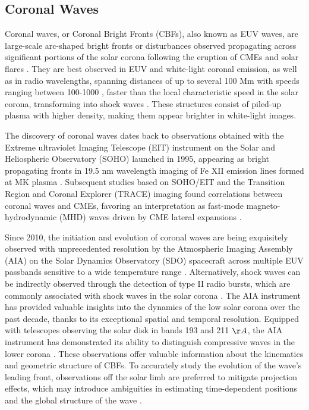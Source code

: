 \subsection{Coronal Waves}
Coronal waves, or Coronal Bright Fronts (CBFs), also known as EUV waves, are large-scale arc-shaped bright fronts or disturbances observed propagating across significant portions of the solar corona following the eruption of CMEs and solar flares \citep{thompson_1998, nindos_2008, vrsnak_2008, magdalenic_2010, veronig_2010, warmuth_2015}. They are best observed in EUV and white-light coronal emission, as well as in radio wavelengths, spanning distances of up to several 100 Mm with speeds ranging between 100-1000 \kms, faster than the local characteristic speed in the solar corona, transforming into shock waves \citep{pick_2006, thompson_2009, nitta_2013, liu_2014}. These structures consist of piled-up plasma with higher density, making them appear brighter in white-light images.

The discovery of coronal waves dates back to observations obtained with the Extreme ultraviolet Imaging Telescope (EIT) instrument on the Solar and Heliospheric Observatory (SOHO) launched in 1995, appearing as bright propagating fronts in 19.5 nm wavelength imaging of Fe XII emission lines formed at  MK plasma \citep{thompson_1998}. Subsequent studies based on SOHO/EIT and the Transition Region and Coronal Explorer (TRACE) imaging found correlations between coronal waves and CMEs, favoring an interpretation as fast-mode magneto-hydrodynamic (MHD) waves driven by CME lateral expansions \citep{biesecker_2002}.

Since 2010, the initiation and evolution of coronal waves are being exquisitely observed with unprecedented resolution by the Atmospheric Imaging Assembly (AIA) on the Solar Dynamics Observatory (SDO) spacecraft \citep{lemen_2012} across multiple EUV passbands sensitive to a wide temperature range \citep{nitta_2013}. Alternatively, shock waves can be indirectly observed through the detection of type II radio bursts, which are commonly associated with shock waves in the solar corona \cite{vrsnak_2008}.
The AIA instrument has provided valuable insights into the dynamics of the low solar corona over the past decade, thanks to its exceptional spatial and temporal resolution. Equipped with telescopes observing the solar disk in bands 193 and 211 $\AA$, the AIA instrument has demonstrated its ability to distinguish compressive waves in the lower corona \cite{patsourakos_2010, ma_2011, kozarev_2011}. These observations offer valuable information about the kinematics and geometric structure of CBFs. To accurately study the evolution of the wave's leading front, observations off the solar limb are preferred to mitigate projection effects, which may introduce ambiguities in estimating time-dependent positions and the global structure of the wave \cite{kozarev_2015}.

